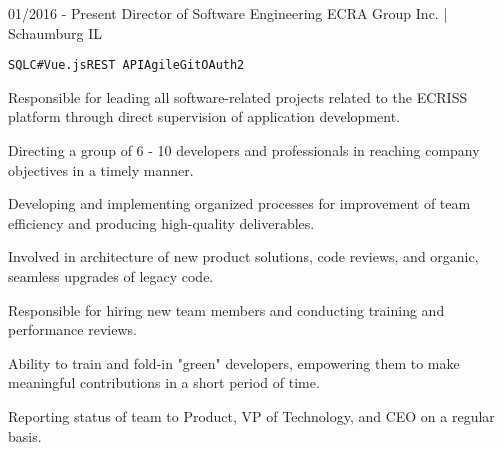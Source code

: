 \documentclass[9pt]{developercv} %
\begin{document}
\begin{entrylist}
	\entry
		{01/2016 - Present}
		{Director of Software Engineering}
		{ECRA Group Inc. | Schaumburg IL}
		{
		 \texttt{SQL}\slashsep\texttt{C\#}\slashsep\texttt{Vue.js}\slashsep\texttt{REST API}\slashsep\texttt{Agile}\slashsep\texttt{Git}\slashsep\texttt{OAuth2}\\
	 \begin{compactitem}
        \item Responsible for leading all software-related projects related to the ECRISS platform through direct supervision of application development.
        \item Directing a group of 6 - 10 developers and professionals in reaching company objectives in a timely manner.
        \item Developing and implementing organized processes for improvement of team efficiency and producing high-quality deliverables. 
        \item   Involved in architecture of new product solutions, code reviews, and organic, seamless upgrades of legacy code. 
        \item Responsible for hiring new team members and conducting training and performance reviews. 
    	\item Ability to train and fold-in "green" developers, empowering them to make meaningful contributions in a short period of time.
        \item Reporting status of team to Product, VP of Technology, and CEO on a regular basis.
    \end{compactitem}
    
}
\end{entrylist}
\end{document}

